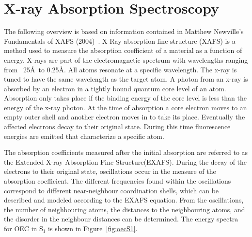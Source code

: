 \section{X-ray Absorption Spectroscopy}

The following overview is based on information contained in Matthew Newville’s Fundamentals of XAFS (2004)~\cite{newville2004fundamentals}. X-Ray absorption fine structure (XAFS) is a method used to measure the absorption coefficient of a material as a function of energy. X-rays are part of the electromagnetic spectrum with wavelengths ranging from ~25\AA\ to 0.25\AA. All atoms resonate at a specific wavelength. The x-ray is tuned to have the same wavelength as the target atom. A photon from an x-ray is absorbed by an electron in a tightly bound quantum core level of an atom. Absorption only takes place if the binding energy of the core level is less than the energy of the x-ray photon. At the time of absorption a core electron moves to an empty outer shell and another electron moves in to take its place. Eventually the affected electrons decay to their original state. During this time fluorescence energies are emitted that characterize a specific atom.

The absorption coefficients measured after the initial absorption are referred to as the Extended X-ray Absorption Fine Structure(EXAFS). During the decay of the electrons to their original state, oscillations occur in the measure of the absorption coefficient. The different frequencies found within the oscillations correspond to different near-neighbour coordination shells, which can be described and modeled according to the EXAFS equation. From the oscillations, the number of neighbouring atoms, the distances to the neighbouring atoms, and the disorder in the neighbour distances can be determined. The energy spectra for OEC in S$_{1}$ is shown in Figure~\ref{fig:oecS1}.

\begin{figure*}
	\caption{EXAFS Spectra of OEC in S$_{1}$}
	\label{fig:oecS1}
\end{figure*}